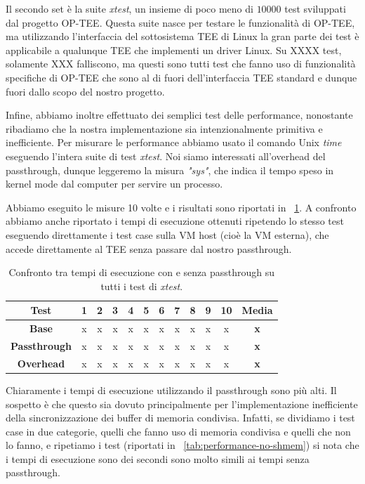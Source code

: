 \documentclass[12pt,italian]{report}
\begin{document}
Il secondo set è la suite \textit{xtest}, un insieme di poco meno di
$10000$ test sviluppati dal progetto OP-TEE. 
Questa suite nasce per testare le funzionalità di OP-TEE, ma utilizzando
l'interfaccia del sottosistema TEE di Linux la gran parte dei test è
applicabile a qualunque TEE che implementi un driver Linux. 
Su XXXX test, solamente XXX falliscono, ma questi sono tutti test che
fanno uso di funzionalità specifiche di OP-TEE che sono al di fuori
dell'interfaccia TEE standard e dunque fuori dallo scopo del nostro
progetto.

Infine, abbiamo inoltre effettuato dei semplici test delle performance,
nonostante ribadiamo che la nostra implementazione sia intenzionalmente
primitiva e inefficiente.
Per misurare le performance abbiamo usato il comando Unix \textit{time}
eseguendo l'intera suite di test \textit{xtest}.
Noi siamo interessati all'overhead del passthrough, dunque leggeremo la
misura \textit{"sys"}, che indica il tempo speso in kernel mode dal computer
per servire un processo. 

Abbiamo eseguito le misure 10 volte e i risultati sono riportati
in \tablename~\ref{tab:performance}.
A confronto abbiamo anche riportato i tempi di esecuzione ottenuti ripetendo
lo stesso test eseguendo direttamente i test case sulla VM host
(cioè la VM esterna), che accede direttamente al TEE senza passare dal
nostro passthrough.

\begin{table}[ht]
    \centering
    \begin{tabular}{|c|c|c|c|c|c|c|c|c|c|c|c|}
        \hline
        \textbf{Test} & 1 & 2 & 3 & 4 & 5 & 6 & 7 & 8 & 9 & 10 & \textbf{Media} \\
        \hline
        \textbf{Base} & x & x & x & x & x & x & x & x & x & x  & \textbf{x} \\
        \hline
        \textbf{Passthrough} & x & x & x & x & x & x & x & x & x & x & \textbf{x} \\
        \hline
        \textbf{Overhead} & x & x & x & x & x & x & x & x & x & x & \textbf{x} \\
        \hline
    \end{tabular}
    \label{tab:performance}
    \caption{
        Confronto tra tempi di esecuzione con e senza passthrough su
        tutti i test di \textit{xtest}.
    }
\end{table}

Chiaramente i tempi di esecuzione utilizzando il passthrough sono più alti.
Il sospetto è che questo sia dovuto principalmente per l'implementazione
inefficiente della sincronizzazione dei buffer di memoria condivisa.
Infatti, se dividiamo i test case in due categorie, quelli che fanno
uso di memoria condivisa e quelli che non lo fanno, e ripetiamo i test
(riportati in \tablename~\ref{tab:performance-no-shmem}) si nota che
i tempi di esecuzione sono dei secondi sono molto simili ai tempi
senza passthrough.
\end{document}
